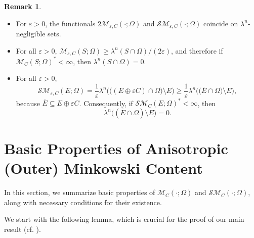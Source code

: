 \documentclass[pdflatex,sn-mathphys-num]{sn-jnl}
\theoremstyle{plain}
\theoremstyle{definition}
\newtheorem{rem}[theorem]{Remark}
\begin{document}
\begin{rem}
\begin{itemize}
\begin{equation}
    \end{equation}
    \item For $\varepsilon>0$, the functionals $2\mathcal{M}_{\varepsilon,C}(\cdot;\Omega)$ and $\mathcal{SM}_{\varepsilon,C}(\cdot;\Omega)$ coincide on $\lambda^n$-negligible sets.
    \item For all $\varepsilon>0$, $\mathcal{M}_{\varepsilon,C}(S;\Omega) \ge \lambda^n(S\cap\Omega)/(2\varepsilon)$, and therefore if $\mathcal{M}_C(S;\Omega)^*<\infty$, then $\lambda^n(S\cap\Omega)=0$.
        \item For all $\varepsilon>0$,
    \[
    \mathcal{SM}_{\varepsilon, C}(E; \Omega)
    =\frac{1}{\varepsilon}\lambda^n\Big(\big((E\oplus \varepsilon C)\cap\Omega\big)\setminus E\Big)
    \geq
    \frac{1}{\varepsilon}\lambda^n\Big(\big(\overline{E}\cap\Omega\big)\setminus E\Big),
    \]
    because $\overline{E}\subseteq E\oplus\varepsilon C$. Consequently, if $\mathcal{SM}_{C}(E; \Omega)^*<\infty$, then
    \[
    \lambda^n\big((\overline{E}\cap\Omega)\setminus E\big)=0.
    \]
\end{itemize}
\end{rem}



\section{Basic Properties of Anisotropic (Outer) Minkowski Content}
\label{secFurtherResults}

In this section, we summarize basic properties of $\mathcal{M}_C(\cdot; \Omega)$ and $\mathcal{SM}_C(\cdot; \Omega)$, along with necessary conditions for their existence.

We start with the following lemma, which is crucial for the proof of our main result (cf. \cite[Lemma 3.3]{Villa2}).
\end{document}
